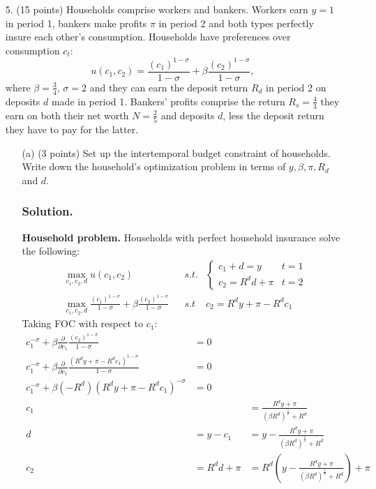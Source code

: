 \documentclass[12pt]{article}
\begin{document}
\begin{enumerate}
\begin{enumerate}
    \end{enumerate}

 \item[5.] (15 points) Households comprise workers and bankers. Workers earn $y = 1$ in period 1, bankers make profits $\pi$ in period 2 and both types perfectly insure each other’s consumption. Households have preferences over consumption $c_t$:
    \[
    u(c_1, c_2) = \frac{(c_1)^{1-\sigma}}{1 - \sigma} + \beta \frac{(c_2)^{1-\sigma}}{1 - \sigma},
    \]
    where $\beta = \frac{3}{4}$, $\sigma = 2$ and they can earn the deposit return $R_d$ in period 2 on deposits $d$ made in period 1. Bankers’ profits comprise the return $R_s = \frac{4}{3}$ they earn on both their net worth $N = \frac{2}{5}$ and deposits $d$, less the deposit return they have to pay for the latter.
    
    \begin{enumerate}
        \item[(a)] {(3 points)} Set up the intertemporal budget constraint of households. Write down the household’s optimization problem in terms of $y, \beta, \pi, R_d$ and $d$.
        \subsubsection*{Solution.}

        \textbf{Household problem.} Households with perfect household insurance solve the following: 
        \begin{align*}
            &\max_{c_1,c_2,d} u(c_1,c_2) 
            && s.t. &\begin{cases}
                c_1 + d = y & t=1 \\ c_2 = R^d d + \pi & t=2 
            \end{cases}
            \\ &\max _{c_1,c_2,d} \frac{(c_1)^{1-\sigma}}{1 - \sigma} + \beta \frac{(c_2)^{1-\sigma}}{1 - \sigma} && s.t & c_2 = R^d y + \pi - R^d c_1
        \end{align*}
        Taking FOC with respect to  $c_1$: 
        \begin{align*}
            c_1^{-\sigma} + \beta \frac{\partial }{\partial c_1 }\frac{(c_2)^{1-\sigma}}{1 - \sigma}  &= 0
            \\  c_1^{-\sigma} + \beta \frac{\partial }{\partial c_1 }\frac{( R^d y + \pi - R^d c_1)^{1-\sigma}}{1 - \sigma}  &= 0
            \\ c_1^{-\sigma} + \beta (- R^d) ( R^d y + \pi - R^d c_1)^{-\sigma}&= 0
            \\ c_1 &&= \frac{R^{d}y+\pi}{\left(\beta R^{d}\right)^{\frac{1}{\sigma}}+R^{d}}
            \\ d &= y - c_1  &= y - \frac{R^{d}y+\pi}{\left(\beta R^{d}\right)^{\frac{1}{\sigma}}+R^{d}}
            \\ c_2 &= R^d d + \pi &= R^d \left(  y - \frac{R^{d}y+\pi}{\left(\beta R^{d}\right)^{\frac{1}{\sigma}}+R^{d}}\right)  + \pi
        \end{align*}


\end{enumerate}
\end{enumerate}
\end{document}
